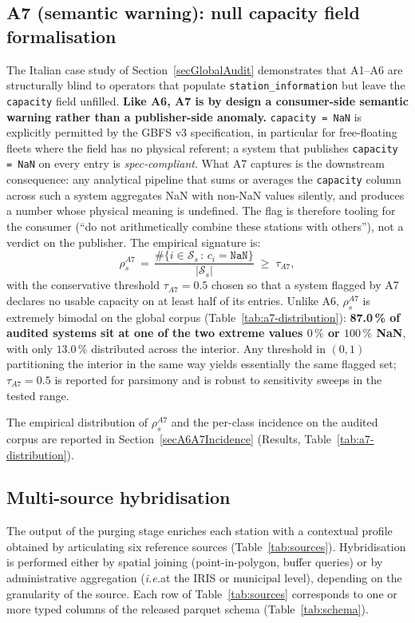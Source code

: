 \documentclass[11pt,a4paper]{article}
\newcommand{\ie}{\emph{i.e.}}
\begin{document}
\subsection{A7 (semantic warning): null capacity field formalisation}\label{secA7Formalisation}
The Italian case study of Section~\ref{secGlobalAudit} demonstrates
that A1--A6 are structurally blind to operators that populate
\texttt{station\_information} but leave the \texttt{capacity} field
unfilled. \textbf{Like A6, A7 is by design a consumer-side
semantic warning rather than a publisher-side anomaly.} \texttt{capacity = NaN} is
explicitly permitted by the GBFS v3 specification, in particular
for free-floating fleets where the field has no physical referent;
a system that publishes \texttt{capacity = NaN} on every entry is
\emph{spec-compliant}. What A7 captures is the downstream
consequence: any analytical pipeline that sums or averages the
\texttt{capacity} column across such a system aggregates NaN with
non-NaN values silently, and produces a number whose physical
meaning is undefined. The flag is therefore tooling for the
consumer (``do not arithmetically combine these stations with
others''), not a verdict on the publisher. The empirical signature
is:
\begin{equation}
\rho_s^{A7} \,=\,
\frac{\#\{i \in \mathcal{S}_s \,:\, c_i = \mathtt{NaN}\}}{|\mathcal{S}_s|}
\;\geq\; \tau_{A7},
\end{equation}
with the conservative threshold $\tau_{A7} = 0.5$ chosen so that a
system flagged by A7 declares no usable capacity on at least half
of its entries. Unlike A6, $\rho_s^{A7}$ is extremely bimodal on
the global corpus
(Table~\ref{tab:a7-distribution}): \textbf{87.0\,\% of audited
systems sit at one of the two extreme values $0\,\%$ or $100\,\%$
NaN}, with only $13.0\,\%$ distributed across the interior. Any
threshold in $(0, 1)$ partitioning the interior in the same way
yields essentially the same flagged set; $\tau_{A7} = 0.5$ is
reported for parsimony and is robust to sensitivity sweeps in the
tested range.

The empirical distribution of $\rho_s^{A7}$ and the
per-class incidence on the audited corpus are reported in
Section~\ref{secA6A7Incidence} (Results,
Table~\ref{tab:a7-distribution}).

\subsection{Multi-source hybridisation}
The output of the purging stage enriches each station with a
contextual profile obtained by articulating six reference sources
(Table~\ref{tab:sources}). Hybridisation is performed either by
spatial joining (point-in-polygon, buffer queries) or by
administrative aggregation (\ie at the IRIS or municipal level),
depending on the granularity of the source. Each row of
Table~\ref{tab:sources} corresponds to one or more typed columns
of the released parquet schema (Table~\ref{tab:schema}).
\end{document}
